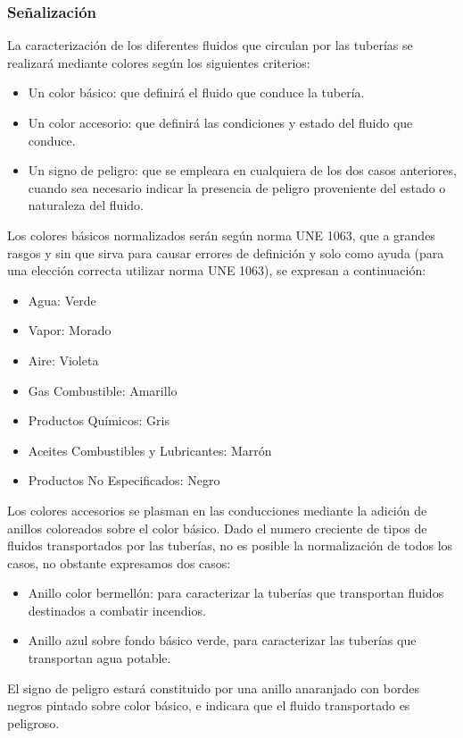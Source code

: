 \documentclass[../main.tex]{subfiles}
\begin{document}
\subsubsection{Señalización}
La caracterización de los diferentes fluidos que circulan por las tuberías se realizará mediante colores según los siguientes criterios:
\begin{itemize}
    \item Un color básico: que definirá el fluido que conduce la tubería.
    \item Un color accesorio: que definirá las condiciones y estado del fluido que conduce.
    \item Un signo de peligro: que se empleara en cualquiera de los dos casos anteriores, cuando sea necesario indicar la presencia de peligro proveniente del estado o naturaleza del fluido.
\end{itemize}
Los colores básicos normalizados serán según norma UNE 1063, que a grandes rasgos y sin que sirva para causar errores de definición y solo como ayuda (para una elección correcta utilizar norma UNE 1063), se expresan a continuación:
\begin{itemize}
    \item Agua: Verde
    \item Vapor: Morado
    \item Aire: Violeta
    \item Gas Combustible: Amarillo
    \item Productos Químicos: Gris
    \item Aceites Combustibles y Lubricantes: Marrón
    \item Productos No Especificados: Negro
\end{itemize}
Los colores accesorios se plasman en las conducciones mediante la adición de anillos coloreados sobre el color básico. Dado el numero creciente de tipos de fluidos transportados por las tuberías, no es posible la normalización de todos los casos, no obstante expresamos dos casos:
\begin{itemize}
    \item Anillo color bermellón: para caracterizar la tuberías que transportan fluidos destinados a combatir incendios.
    \item Anillo azul sobre fondo básico verde, para caracterizar las tuberías que transportan agua potable.
\end{itemize}
El signo de peligro estará constituido por una anillo anaranjado con bordes negros pintado sobre color básico, e indicara que el fluido transportado es peligroso.
\end{document}
